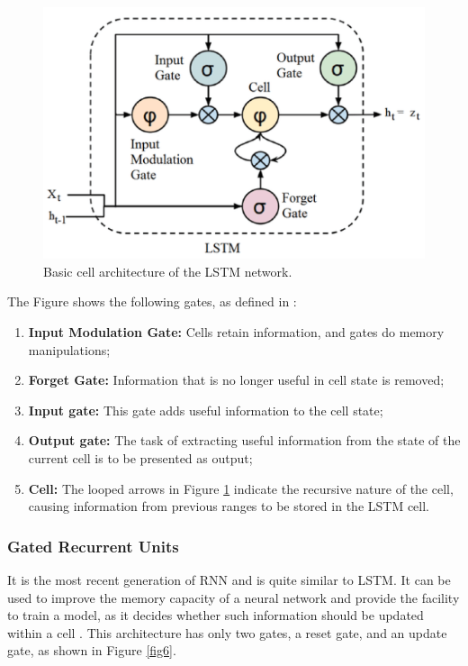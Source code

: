 \documentclass[conference]{IEEEtran}
\begin{document}
\begin{figure}[htbp]
\centerline{\includegraphics[scale=0.4]{images/lstm.png}}
\caption{Basic cell architecture of the LSTM network.}
\label{fig5}
\end{figure}

The Figure shows the following gates, as defined in \cite{b6}:
\begin{enumerate}
    \item \textbf{Input Modulation Gate:} Cells retain information, and gates do memory manipulations;
    \item \textbf{Forget Gate:} Information that is no longer useful in cell state is removed;
    \item \textbf{Input gate:} This gate adds useful information to the cell state;
    \item \textbf{Output gate:} The task of extracting useful information from the state of the current cell is to be presented as output;
    \item \textbf{Cell:} The looped arrows in Figure \ref{fig5} indicate the recursive nature of the cell, causing information from previous ranges to be stored in the LSTM cell.


\end{enumerate}




\subsubsection{Gated Recurrent Units}
It is the most recent generation of RNN and is quite similar to LSTM. It can be used to improve the memory capacity of a neural network and provide the facility to train a model, as it decides whether such information should be updated within a cell \cite{b6}. This architecture has only two gates, a reset gate, and an update gate, as shown in Figure \ref{fig6}.
\end{document}
